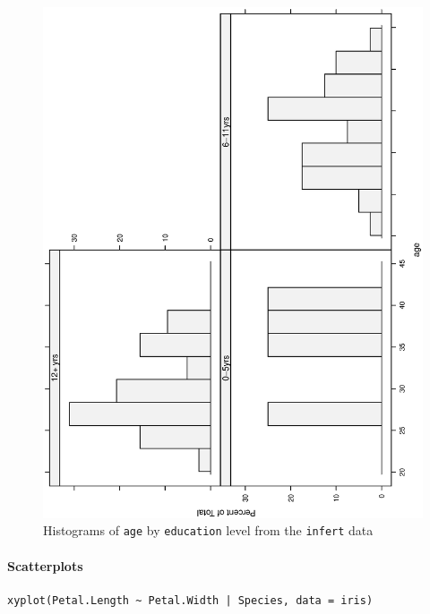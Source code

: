 \documentclass[captions=tableheading]{scrbook}
\begin{document}
\begin{figure}[th]
  \includegraphics[angle=270, totalheight=4in]{ps/histograms-lattice.ps}
  \caption[Histograms of \texttt{age} by \texttt{education} level]{Histograms of \texttt{age} by \texttt{education} level from the \texttt{infert} data}
  \label{fig:histograms-lattice}
\end{figure}

\paragraph*{Scatterplots}


\begin{verbatim}
xyplot(Petal.Length ~ Petal.Width | Species, data = iris)
\end{verbatim}
\end{document}
